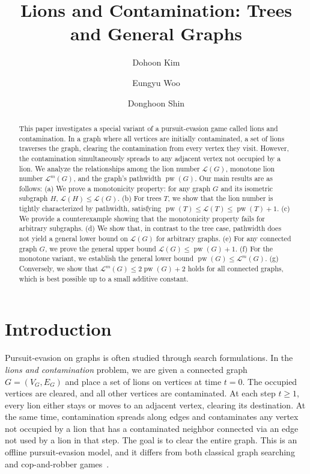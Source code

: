 \documentclass[a4paper,UKenglish,cleveref, autoref, thm-restate]{lipics-v2021}
\title{Lions and Contamination: Trees and General Graphs} %
\author{Dohoon Kim}{School of Undergraduate Studies, DGIST, South Korea}{cdjs1432@dgist.ac.kr}{https://orcid.org/0009-0003-7565-9045}{}
\author{Eungyu Woo}{Department of EECS, DGIST, South Korea}{ekwoo@dgist.ac.kr}{https://orcid.org/0009-0000-3621-5175}{}
\author{Donghoon Shin}{Department of EECS, DGIST, South Korea}{dshin@dgist.ac.kr}{https://orcid.org/0009-0004-7088-3846}{}
\begin{document}
\maketitle

\begin{abstract}
This paper investigates a special variant of a pursuit-evasion game called lions and contamination. In a graph where all vertices are initially contaminated, a set of lions traverses the graph, clearing the contamination from every vertex they visit. However, the contamination simultaneously spreads to any adjacent vertex not occupied by a lion. We analyze the relationships among the lion number $\mathcal{L}(G)$, monotone lion number $\mathcal{L}^m(G)$, and the graph's pathwidth $\operatorname{pw}(G)$. Our main results are as follows: 
(a) We prove a monotonicity property: for any graph $G$ and its isometric subgraph $H$, $\mathcal{L}(H)\le \mathcal{L}(G)$.
(b) For trees $T$, we show that the lion number is tightly characterized by pathwidth, satisfying $\operatorname{pw}(T)\le \mathcal{L}(T)\le \operatorname{pw}(T)+1$.
(c) We provide a counterexample showing that the monotonicity property fails for arbitrary subgraphs.
(d) We show that, in contrast to the tree case, pathwidth does not yield a general lower bound on $\mathcal{L}(G)$ for arbitrary graphs.
(e) For any connected graph $G$, we prove the general upper bound $\mathcal{L}(G)\le \operatorname{pw}(G)+1$.
(f) For the monotone variant, we establish the general lower bound $\operatorname{pw}(G)\le \mathcal{L}^m(G)$.
(g) Conversely, we show that $\mathcal{L}^m(G)\le 2\operatorname{pw}(G)+2$ holds for all connected graphs, which is best possible up to a small additive constant.
\end{abstract}

\section{Introduction}
Pursuit-evasion on graphs is often studied through search formulations. In the \emph{lions and contamination} problem, we are given a connected graph \(G=(V_G,E_G)\) and place a set of lions on vertices at time \(t=0\). The occupied vertices are cleared, and all other vertices are contaminated. At each step \(t\ge 1\), every lion either stays or moves to an adjacent vertex, clearing its destination. At the same time, contamination spreads along edges and contaminates any vertex not occupied by a lion that has a contaminated neighbor connected via an edge not used by a lion in that step. The goal is to clear the entire graph. This is an offline pursuit-evasion model, and it differs from both classical graph searching and cop-and-robber games~\cite{Berger09,Dumitrescu07}.
\end{document}

